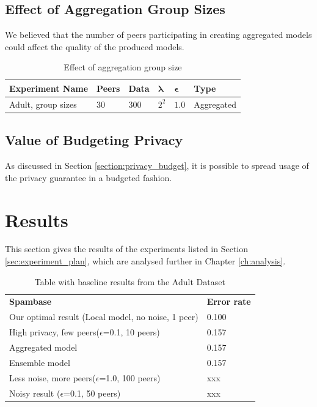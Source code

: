 \subsection{Effect of Aggregation Group Sizes}

We believed that the number of peers participating in creating aggregated models could affect the quality of the produced models. 

\begin{table}[h]
	\centering
	\label{tab:experiments_group_sizes}
	\begin{tabular}{|l|l|l|l|l|l|}
		{\bf Experiment Name}                  & {\bf Peers} & {\bf Data} & $\boldsymbol{\lambda}$ & $\boldsymbol{\epsilon}$ & {\bf Type} \\
		\hline
		Adult, group sizes       & 30          & 300        & $2^{2}$   & $1.0$      & Aggregated   \\
	\end{tabular}
	\caption{Effect of aggregation group size}
\end{table}

\subsection{Value of Budgeting Privacy}

As discussed in Section \ref{section:privacy_budget}, it is possible to spread usage of the privacy guarantee in a budgeted fashion.

\FloatBarrier

\section{Results}

This section gives the results of the experiments listed in Section \ref{sec:experiment_plan}, which are analysed further in Chapter \ref{ch:analysis}.

\begin{table}[h]
	\begin{tabular}{ll}
		\textbf{Spambase} & \textbf{Error rate}\\
		Our optimal result (Local model, no noise, 1 peer)                & 0.100  \\
		High privacy, few peers($\epsilon$=0.1, 10 peers)				  & 0.157  \\
		Aggregated model				                                  & 0.157  \\
		Ensemble model				                                      & 0.157  \\
		Less noise, more peers($\epsilon$=1.0, 100 peers)				  & xxx  \\
		Noisy result ($\epsilon$=0.1, 50 peers)                           & xxx  \\
		
		
	\end{tabular}
	\caption{Table with baseline results from the Adult Dataset}
	\label{tab:baseline_class_results_spambase}
\end{table}

